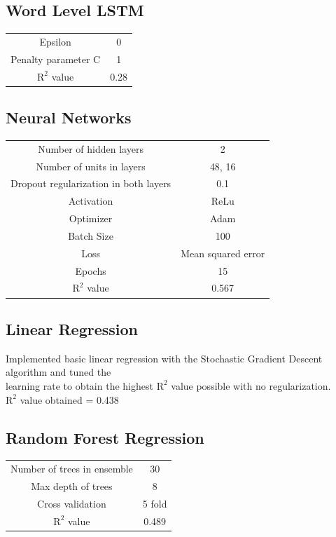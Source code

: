 \documentclass[15pt]{article}
\begin{document}
\subsection{Word Level LSTM}
\begin{center}
\begin{tabular}{c c}
Epsilon & 0 \\
Penalty parameter C & 1 \\
$\text{R}^{2}$ value & 0.28 \\
\end{tabular}
\end{center}

\subsection{Neural Networks}
\begin{center}
\begin{tabular}{c c}
Number of hidden layers & 2 \\
Number of units in layers & 48, 16 \\
Dropout regularization in both layers & 0.1 \\
Activation & ReLu \\
Optimizer & Adam \\
Batch Size & 100 \\
Loss & Mean squared error \\
Epochs & 15 \\ 
$\text{R}^{2}$ value & 0.567 \\
\end{tabular}
\end{center}
\subsection{Linear Regression}
Implemented basic linear regression with the Stochastic Gradient Descent algorithm and tuned the\\ \hspace*{4.5mm} learning rate to obtain the highest $\text{R}^{2}$ value possible with no regularization.\\
\hspace*{5mm}$\text{R}^{2}$ value obtained = 0.438

\subsection{Random Forest Regression}
\begin{center}
\begin{tabular}{c c}
Number of trees in ensemble & 30 \\
Max depth of trees & 8 \\
Cross validation & 5 fold \\
$\text{R}^{2}$ value & 0.489 \\

\end{tabular}
\end{center}
\end{document}
